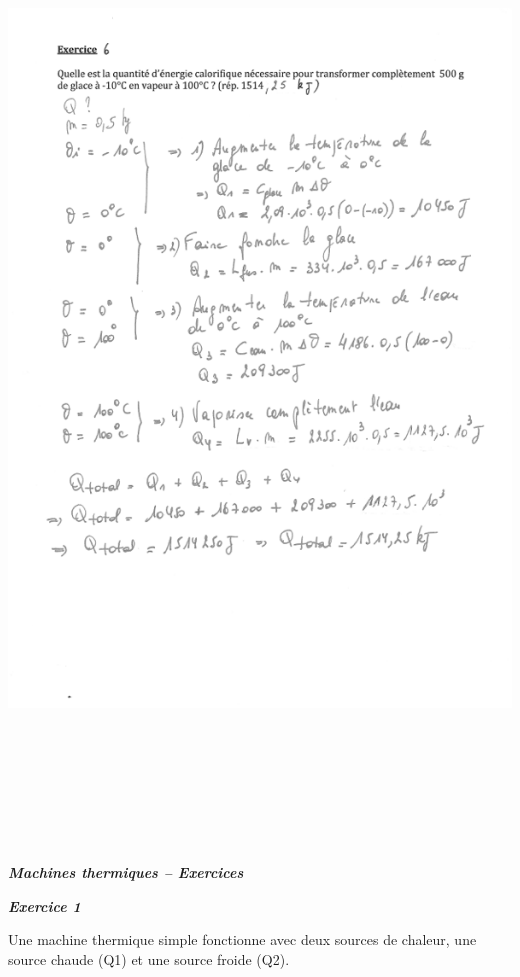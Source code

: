 \includegraphics[width=18.486cm,height=25.73cm]{Pictures/100000010000024E000003341A59B4106578A675.png}

\emph{\textbf{Machines thermiques -- Exercices}}

\emph{\textbf{Exercice 1}}

Une machine thermique simple fonctionne avec deux sources de chaleur,
une source chaude (Q1) et une source froide (Q2).

